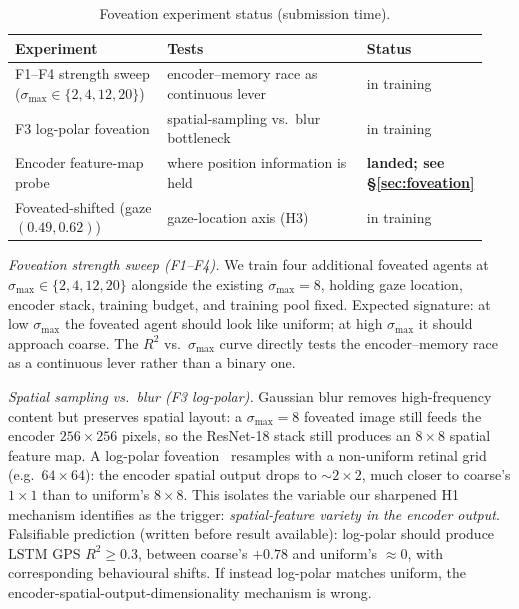 \documentclass{article}
\newcommand{\hcpending}[1]{{\color{hcpendingcol}#1}}
\begin{document}
\begin{table}[h]
\centering
\small
\caption{Foveation experiment status (submission time).}
\label{tab:fov-status}
\footnotesize\begin{tabular}{@{}p{0.32\linewidth}p{0.42\linewidth}p{0.20\linewidth}@{}}
\toprule
Experiment & Tests & Status \\
\midrule
F1--F4 strength sweep ($\sigma_{\max} \in \{2,4,12,20\}$) & encoder--memory race as continuous lever & in training \\
F3 log-polar foveation                                    & spatial-sampling vs.\ blur bottleneck    & in training \\
Encoder feature-map probe                                 & where position information is held       & \textbf{landed; see §\ref{sec:foveation}} \\
Foveated-shifted (gaze $(0.49, 0.62)$)                    & gaze-location axis (H3)                  & in training \\
\bottomrule
\end{tabular}
\end{table}

\hcpending{\emph{Foveation strength sweep (F1--F4).} We train four additional foveated agents at $\sigma_{\max} \in \{2, 4, 12, 20\}$ alongside the existing $\sigma_{\max} = 8$, holding gaze location, encoder stack, training budget, and training pool fixed. Expected signature: at low $\sigma_{\max}$ the foveated agent should look like uniform; at high $\sigma_{\max}$ it should approach coarse. The $R^2$ vs.\ $\sigma_{\max}$ curve directly tests the encoder--memory race as a continuous lever rather than a binary one.}

\emph{Spatial sampling vs.\ blur (F3 log-polar).} Gaussian blur removes high-frequency content but preserves spatial layout: a $\sigma_{\max}=8$ foveated image still feeds the encoder $256{\times}256$ pixels, so the ResNet-18 stack still produces an $8{\times}8$ spatial feature map. A log-polar foveation~\citep{strasburger2011peripheral,rosenholtz2016peripheral} resamples with a non-uniform retinal grid (e.g.\ $64{\times}64$): the encoder spatial output drops to $\sim 2{\times}2$, much closer to coarse's $1{\times}1$ than to uniform's $8{\times}8$. This isolates the variable our sharpened H1 mechanism identifies as the trigger: \emph{spatial-feature variety in the encoder output}. \hcpending{Falsifiable prediction (written before result available): log-polar should produce LSTM GPS $R^2 \geq 0.3$, between coarse's $+0.78$ and uniform's $\approx 0$, with corresponding behavioural shifts. If instead log-polar matches uniform, the encoder-spatial-output-dimensionality mechanism is wrong.}
\end{document}

